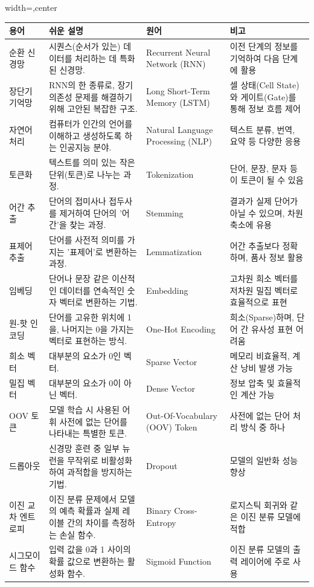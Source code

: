 \documentclass[11pt,a4paper]{article}
\begin{document}
\begin{adjustbox}{width=\textwidth,center}
\begin{tabular}{llll}
\toprule
\textbf{용어} & \textbf{쉬운 설명} & \textbf{원어} & \textbf{비고} \\
\midrule
순환 신경망 & 시퀀스(순서가 있는) 데이터를 처리하는 데 특화된 신경망. & Recurrent Neural Network (RNN) & 이전 단계의 정보를 기억하여 다음 단계에 활용 \\
장단기 기억망 & RNN의 한 종류로, 장기 의존성 문제를 해결하기 위해 고안된 복잡한 구조. & Long Short-Term Memory (LSTM) & 셀 상태(Cell State)와 게이트(Gate)를 통해 정보 흐름 제어 \\
자연어 처리 & 컴퓨터가 인간의 언어를 이해하고 생성하도록 하는 인공지능 분야. & Natural Language Processing (NLP) & 텍스트 분류, 번역, 요약 등 다양한 응용 \\
토큰화 & 텍스트를 의미 있는 작은 단위(토큰)로 나누는 과정. & Tokenization & 단어, 문장, 문자 등이 토큰이 될 수 있음 \\
어간 추출 & 단어의 접미사나 접두사를 제거하여 단어의 '어간'을 찾는 과정. & Stemming & 결과가 실제 단어가 아닐 수 있으며, 차원 축소에 유용 \\
표제어 추출 & 단어를 사전적 의미를 가지는 '표제어'로 변환하는 과정. & Lemmatization & 어간 추출보다 정확하며, 품사 정보 활용 \\
임베딩 & 단어나 문장 같은 이산적인 데이터를 연속적인 숫자 벡터로 변환하는 기법. & Embedding & 고차원 희소 벡터를 저차원 밀집 벡터로 효율적으로 표현 \\
원-핫 인코딩 & 단어를 고유한 위치에 1을, 나머지는 0을 가지는 벡터로 표현하는 방식. & One-Hot Encoding & 희소(Sparse)하며, 단어 간 유사성 표현 어려움 \\
희소 벡터 & 대부분의 요소가 0인 벡터. & Sparse Vector & 메모리 비효율적, 계산 낭비 발생 가능 \\
밀집 벡터 & 대부분의 요소가 0이 아닌 벡터. & Dense Vector & 정보 압축 및 효율적인 계산 가능 \\
OOV 토큰 & 모델 학습 시 사용된 어휘 사전에 없는 단어를 나타내는 특별한 토큰. & Out-Of-Vocabulary (OOV) Token & 사전에 없는 단어 처리 방식 중 하나 \\
드롭아웃 & 신경망 훈련 중 일부 뉴런을 무작위로 비활성화하여 과적합을 방지하는 기법. & Dropout & 모델의 일반화 성능 향상 \\
이진 교차 엔트로피 & 이진 분류 문제에서 모델의 예측 확률과 실제 레이블 간의 차이를 측정하는 손실 함수. & Binary Cross-Entropy & 로지스틱 회귀와 같은 이진 분류 모델에 적합 \\
시그모이드 함수 & 입력 값을 0과 1 사이의 확률 값으로 변환하는 활성화 함수. & Sigmoid Function & 이진 분류 모델의 출력 레이어에 주로 사용 \\
\bottomrule
\end{tabular}
\end{adjustbox}
\end{document}
